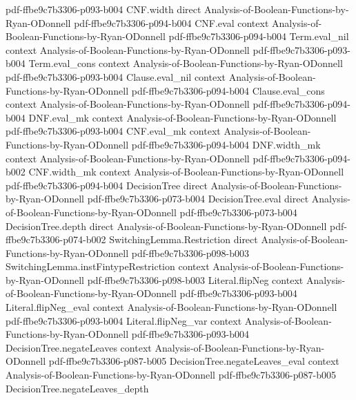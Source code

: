 \begin{theorem}
  {pdf-ffbe9c7b3306-p093-b004}
\proofstep
  {CNF.width}
  {direct}
  {Analysis-of-Boolean-Functions-by-Ryan-ODonnell}
  {pdf-ffbe9c7b3306-p094-b004}
\proofstep
  {CNF.eval}
  {context}
  {Analysis-of-Boolean-Functions-by-Ryan-ODonnell}
  {pdf-ffbe9c7b3306-p094-b004}
\proofstep
  {Term.eval_nil}
  {context}
  {Analysis-of-Boolean-Functions-by-Ryan-ODonnell}
  {pdf-ffbe9c7b3306-p093-b004}
\proofstep
  {Term.eval_cons}
  {context}
  {Analysis-of-Boolean-Functions-by-Ryan-ODonnell}
  {pdf-ffbe9c7b3306-p093-b004}
\proofstep
  {Clause.eval_nil}
  {context}
  {Analysis-of-Boolean-Functions-by-Ryan-ODonnell}
  {pdf-ffbe9c7b3306-p094-b004}
\proofstep
  {Clause.eval_cons}
  {context}
  {Analysis-of-Boolean-Functions-by-Ryan-ODonnell}
  {pdf-ffbe9c7b3306-p094-b004}
\proofstep
  {DNF.eval_mk}
  {context}
  {Analysis-of-Boolean-Functions-by-Ryan-ODonnell}
  {pdf-ffbe9c7b3306-p093-b004}
\proofstep
  {CNF.eval_mk}
  {context}
  {Analysis-of-Boolean-Functions-by-Ryan-ODonnell}
  {pdf-ffbe9c7b3306-p094-b004}
\proofstep
  {DNF.width_mk}
  {context}
  {Analysis-of-Boolean-Functions-by-Ryan-ODonnell}
  {pdf-ffbe9c7b3306-p094-b002}
\proofstep
  {CNF.width_mk}
  {context}
  {Analysis-of-Boolean-Functions-by-Ryan-ODonnell}
  {pdf-ffbe9c7b3306-p094-b004}
\proofstep
  {DecisionTree}
  {direct}
  {Analysis-of-Boolean-Functions-by-Ryan-ODonnell}
  {pdf-ffbe9c7b3306-p073-b004}
\proofstep
  {DecisionTree.eval}
  {direct}
  {Analysis-of-Boolean-Functions-by-Ryan-ODonnell}
  {pdf-ffbe9c7b3306-p073-b004}
\proofstep
  {DecisionTree.depth}
  {direct}
  {Analysis-of-Boolean-Functions-by-Ryan-ODonnell}
  {pdf-ffbe9c7b3306-p074-b002}
\proofstep
  {SwitchingLemma.Restriction}
  {direct}
  {Analysis-of-Boolean-Functions-by-Ryan-ODonnell}
  {pdf-ffbe9c7b3306-p098-b003}
\proofstep
  {SwitchingLemma.instFintypeRestriction}
  {context}
  {Analysis-of-Boolean-Functions-by-Ryan-ODonnell}
  {pdf-ffbe9c7b3306-p098-b003}
\proofstep
  {Literal.flipNeg}
  {context}
  {Analysis-of-Boolean-Functions-by-Ryan-ODonnell}
  {pdf-ffbe9c7b3306-p093-b004}
\proofstep
  {Literal.flipNeg_eval}
  {context}
  {Analysis-of-Boolean-Functions-by-Ryan-ODonnell}
  {pdf-ffbe9c7b3306-p093-b004}
\proofstep
  {Literal.flipNeg_var}
  {context}
  {Analysis-of-Boolean-Functions-by-Ryan-ODonnell}
  {pdf-ffbe9c7b3306-p093-b004}
\proofstep
  {DecisionTree.negateLeaves}
  {context}
  {Analysis-of-Boolean-Functions-by-Ryan-ODonnell}
  {pdf-ffbe9c7b3306-p087-b005}
\proofstep
  {DecisionTree.negateLeaves_eval}
  {context}
  {Analysis-of-Boolean-Functions-by-Ryan-ODonnell}
  {pdf-ffbe9c7b3306-p087-b005}
\proofstep
  {DecisionTree.negateLeaves_depth}

\end{theorem}
